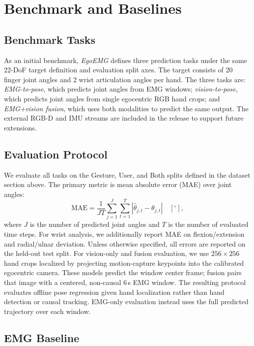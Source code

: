 \documentclass[letterpaper]{article} %
\newcommand{\dataset}{\textit{EgoEMG}}
\begin{document}
\section{Benchmark and Baselines}

\subsection{Benchmark Tasks}

As an initial benchmark, \dataset{} defines three prediction tasks under the same 22-DoF target
definition and evaluation split axes. The target consists of 20 finger joint angles
and 2 wrist articulation angles per hand. The three tasks are:
\emph{EMG-to-pose}, which predicts joint angles from EMG windows;
\emph{vision-to-pose}, which predicts joint angles from single egocentric RGB hand
crops; and \emph{EMG+vision fusion}, which uses both modalities to predict the
same output. The external RGB-D and IMU streams are included in the release to
support future extensions.

\subsection{Evaluation Protocol}

We evaluate all tasks on the Gesture, User, and Both splits defined in the
dataset section above. The primary metric is mean absolute error (MAE) over joint
angles:
\begin{equation}
\text{MAE} =
\frac{1}{JT}
\sum_{j=1}^{J}\sum_{t=1}^{T}
|\hat{\theta}_{j,t} - \theta_{j,t}|
\quad [^\circ],
\end{equation}
where $J$ is the number of predicted joint angles and $T$ is the number of
evaluated time steps. For wrist analysis, we
additionally report MAE on flexion/extension and radial/ulnar deviation. Unless
otherwise specified, all errors are reported on the held-out test split. For
vision-only and fusion evaluation, we use $256\times256$ hand crops localized by
projecting motion-capture keypoints into the calibrated egocentric camera. These
models predict the window center frame; fusion pairs that image with a centered,
non-causal 6\,s EMG window. The resulting protocol evaluates offline pose
regression given hand localization rather than hand detection or causal tracking.
EMG-only evaluation instead uses the full predicted trajectory over each window.

\subsection{EMG Baseline}
\end{document}
